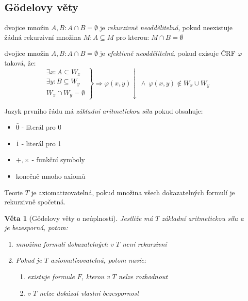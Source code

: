 \documentclass[a4paper]{article}      %
\newtheorem{theorem}{Věta}[section]
\newenvironment{definition}[1][Definice]{\begin{trivlist}
\item[\hskip \labelsep {\bfseries #1}]}{\end{trivlist}}
\begin{document}
\subsection{Gödelovy věty}

\begin{definition}[Rekurzivní neoddělitelnost]
dvojice množin $A,B: A \cap B = \emptyset$ je \emph{rekurzivně neoddělitelná}, pokud neexistuje žádná rekurzivní množina $M: A\subseteq M$ pro kterou: $M \cap B = \emptyset$ 
\end{definition}

\begin{definition}[Efektivní neoddělitelnost]
dvojice množin $A,B: A \cap B = \emptyset$ je \emph{efektivně neoddělitelná}, pokud exisuje ČRF $\varphi$ taková, že:
\[
\left.
\begin{array}{r}
\exists x: A\subseteq W_{x}\\
\exists y: B\subseteq W_{y}\\
W_{x} \cap W_{y} = \emptyset
\end{array}
\right\} \Rightarrow \varphi(x,y)\downarrow\ \wedge\ \varphi(x,y) \notin W_{x} \cup W_{y}
\] 
\end{definition}

\begin{definition}[Základní aritmetická síla]
Jazyk prvního řádu má \emph{základní aritmetickou sílu} pokud obsahuje:
\begin{itemize}
\item $\bar{0}$ - literál pro 0
\item $\bar{1}$ - literál pro 1
\item $+,\times$ - funkční symboly
\item konečně mnoho axiomů
\end{itemize}
\end{definition}

\begin{definition}[Axiomatizovatelnost]
Teorie $T$ je axiomatizovatelná, pokud množina všech dokazatelných formulí je rekurzivně spočetná.
\end{definition}

\begin{theorem}[Gödelovy věty o neúplnosti]
Jestliže má $T$ základní aritmetickou sílu a je bezesporná, potom:
\begin{enumerate}
\item množina formulí dokazatelných v $T$ není rekurzivní
\item Pokud je $T$ axiomatizovatelná, potom navíc:
	\begin{enumerate}
		\item existuje formule $F$, kterou v $T$ nelze rozhodnout
		\item v $T$ nelze dokázat vlastní bezespornost 
	\end{enumerate}
\end{enumerate}
\end{theorem}
\end{document}
